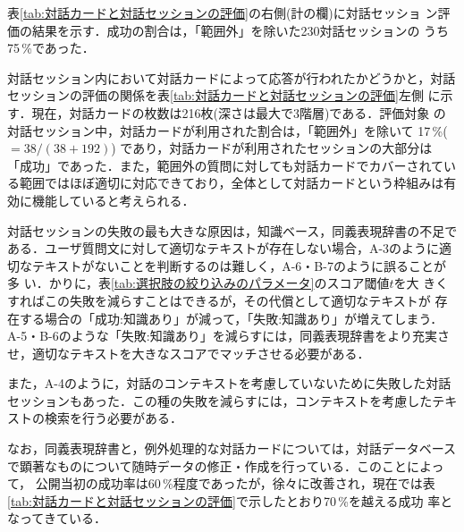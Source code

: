 \vspace*{5mm}


表\ref{tab:対話カードと対話セッションの評価}の右側(計の欄)に対話セッショ
ン評価の結果を示す．成功の割合は，「範囲外」を除いた230対話セッションの
うち75\,\%であった．

対話セッション内において対話カードによって応答が行われたかどうかと，対話
セッションの評価の関係を表\ref{tab:対話カードと対話セッションの評価}左側
に示す．現在，対話カードの枚数は216枚(深さは最大で3階層)である．評価対象
の対話セッション中，対話カードが利用された割合は，「範囲外」を除いて
17\,\%($=38/(38+192)$) であり，対話カードが利用されたセッションの大部分は
「成功」であった．また，範囲外の質問に対しても対話カードでカバーされてい
る範囲ではほぼ適切に対応できており，全体として対話カードという枠組みは有
効に機能していると考えられる．

対話セッションの失敗の最も大きな原因は，知識ベース，同義表現辞書の不足で
ある．ユーザ質問文に対して適切なテキストが存在しない場合，A-3のように適
切なテキストがないことを判断するのは難しく，A-6・B-7のように誤ることが多
い．かりに，表\ref{tab:選択肢の絞り込みのパラメータ}のスコア閾値$t$を大
きくすればこの失敗を減らすことはできるが，その代償として適切なテキストが
存在する場合の「成功:知識あり」が減って，「失敗:知識あり」が増えてしまう．
A-5・B-6のような「失敗:知識あり」を減らすには，同義表現辞書をより充実さ
せ，適切なテキストを大きなスコアでマッチさせる必要がある．

また，A-4のように，対話のコンテキストを考慮していないために失敗した対話
セッションもあった．この種の失敗を減らすには，コンテキストを考慮したテキ
ストの検索を行う必要がある．

なお，同義表現辞書と，例外処理的な対話カードについては，対話データベース
で顕著なものについて随時データの修正・作成を行っている．このことによって，
公開当初の成功率は60\,\%程度であったが，徐々に改善され，現在では表
\ref{tab:対話カードと対話セッションの評価}で示したとおり70\,\%を越える成功
率となってきている．


